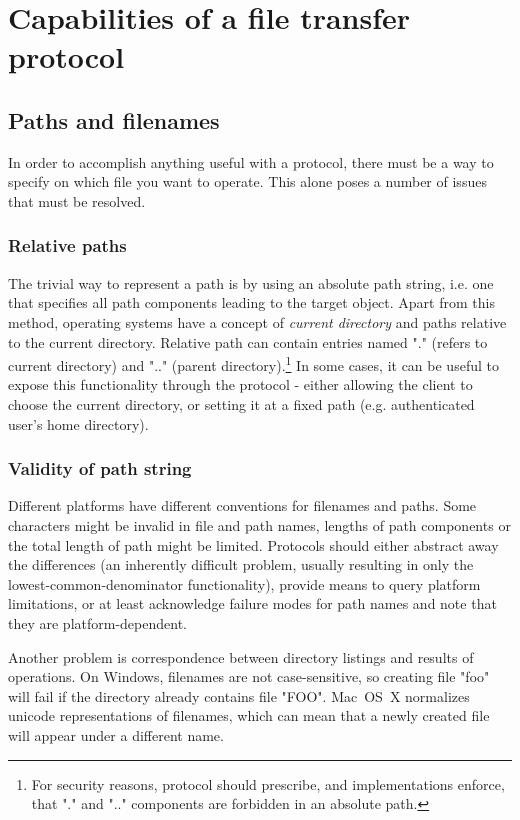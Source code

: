 
\section{Capabilities of a file transfer protocol}

\subsection{Paths and filenames}

In order to accomplish anything useful with a protocol, there must be a way to specify on which file you want
to operate. This alone poses a number of issues that must be resolved.

\subsubsection{Relative paths}

The trivial way to represent a path is by using an absolute path string, i.e. one that specifies all path
components leading to the target object. Apart from this method, operating systems have a concept of {\it
current directory} and paths relative to the current directory. Relative path can contain entries named "."
(refers to current directory) and ".." (parent directory).\footnote{For security reasons, protocol should
prescribe, and implementations enforce, that "." and ".." components are forbidden in an absolute path.} In
some cases, it can be useful to expose this functionality through the protocol - either allowing the client to
choose the current directory, or setting it at a fixed path (e.g. authenticated user's home directory).

\subsubsection{Validity of path string}

Different platforms have different conventions for filenames and paths. Some characters might be invalid in
file and path names, lengths of path components or the total length of path might be limited. Protocols should
either abstract away the differences (an inherently difficult problem, usually resulting in only the
lowest-common-denominator functionality), provide means to query platform limitations, or at least acknowledge
failure modes for path names and note that they are platform-dependent.

Another problem is correspondence between directory listings and results of operations. On Windows, filenames
are not case-sensitive, so creating file "foo" will fail if the directory already contains file "FOO".
Mac~OS~X normalizes unicode representations of filenames, which can mean that a newly created file will appear
under a different name.

